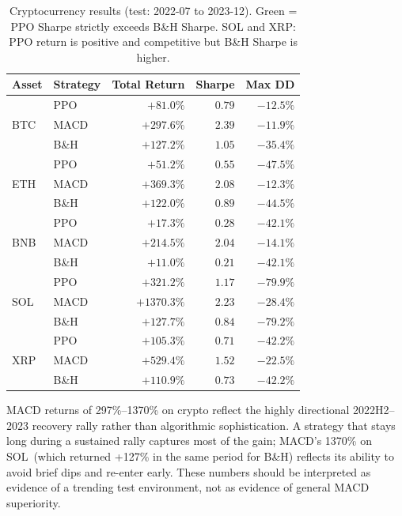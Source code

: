 \documentclass[12pt,a4paper]{article}
\begin{document}
\begin{table}[H]
\centering
\caption{Cryptocurrency results (test: 2022-07 to 2023-12).
\colorbox{wingreen}{Green} = PPO Sharpe strictly exceeds B\&H Sharpe.
SOL and XRP: PPO return is positive and competitive but B\&H Sharpe is higher.}
\label{tab:crypto_results}
\begin{tabular}{llrrr}
\toprule
\textbf{Asset} & \textbf{Strategy} & \textbf{Total Return} & \textbf{Sharpe} & \textbf{Max DD} \\
\midrule
\multirow{3}{*}{BTC}
  & PPO   & $+81.0\%$   & $0.79$  & $-12.5\%$ \\
  & MACD  & $+297.6\%$  & $2.39$  & $-11.9\%$ \\
  & B\&H  & $+127.2\%$  & $1.05$  & $-35.4\%$ \\
\midrule
\multirow{3}{*}{ETH}
  & PPO   & $+51.2\%$   & $0.55$  & $-47.5\%$ \\
  & MACD  & $+369.3\%$  & $2.08$  & $-12.3\%$ \\
  & B\&H  & $+122.0\%$  & $0.89$  & $-44.5\%$ \\
\midrule
\multirow{3}{*}{BNB}
  & PPO   & \cellcolor{wingreen}$+17.3\%$  & \cellcolor{wingreen}$0.28$  & $-42.1\%$ \\
  & MACD  & $+214.5\%$  & $2.04$  & $-14.1\%$ \\
  & B\&H  & $+11.0\%$   & $0.21$  & $-42.1\%$ \\
\midrule
\multirow{3}{*}{SOL}
  & PPO   & \cellcolor{wingreen}$+321.2\%$ & \cellcolor{wingreen}$1.17$  & $-79.9\%$ \\
  & MACD  & $+1370.3\%$ & $2.23$  & $-28.4\%$ \\
  & B\&H  & $+127.7\%$  & $0.84$  & $-79.2\%$ \\
\midrule
\multirow{3}{*}{XRP}
  & PPO   & $+105.3\%$  & $0.71$  & $-42.2\%$ \\
  & MACD  & $+529.4\%$  & $1.52$  & $-22.5\%$ \\
  & B\&H  & $+110.9\%$  & $0.73$  & $-42.2\%$ \\
\bottomrule
\end{tabular}
\end{table}

\begin{tcolorbox}[warnbox, title=Note on MACD crypto returns]
MACD returns of 297\%--1370\% on crypto reflect the highly directional
2022H2--2023 recovery rally rather than algorithmic sophistication. A
strategy that stays long during a sustained rally captures most of the
gain; MACD's 1370\% on SOL~(which returned +127\% in the same period for
B\&H) reflects its ability to avoid brief dips and re-enter early. These
numbers should be interpreted as evidence of a trending test environment,
not as evidence of general MACD superiority.
\end{tcolorbox}
\end{document}
